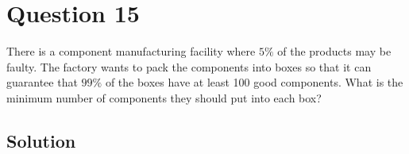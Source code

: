 \section*{Question 15}

There is a component manufacturing facility where \( 5 \% \) of the products may be faulty.
The factory wants to pack the components into boxes so that it can guarantee that \( 99 \% \) of the boxes have at least 100 good components.
What is the minimum number of components they should put into each box?

\subsection*{Solution}
